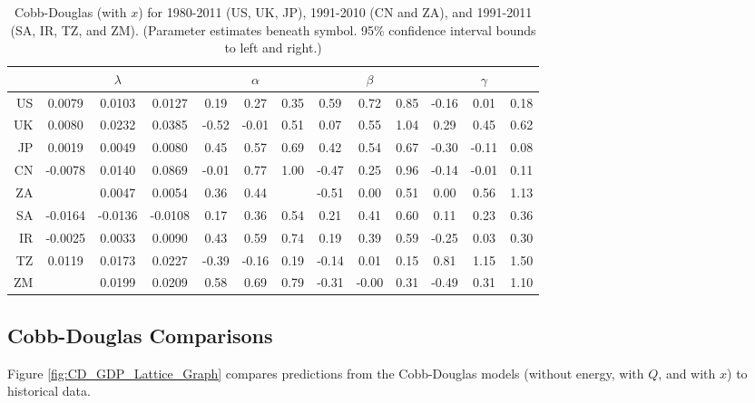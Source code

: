 \documentclass[preprint,authoryear,12pt]{elsarticle}\usepackage{graphicx, color}
\begin{document}
\begin{table}[ht]
\begin{center}
\caption{Cobb-Douglas (with $x$) for 1980-2011 (US, UK, JP), 1991-2010 (CN and ZA), and 1991-2011 (SA, IR, TZ, and ZM). (Parameter estimates beneath symbol. 95\% confidence interval bounds to left and right.)}
\label{tab:CD_Parameters_With_X}
{\tiny
\begin{tabular}{r|ccc|ccc|ccc|ccc}
  \hline
 &   & $\lambda$ &   &   & $\alpha$ &   &   & $\beta$ &   &   & $\gamma$ &   \\ 
  \hline
US & 0.0079 & 0.0103 & 0.0127 & 0.19 & 0.27 & 0.35 & 0.59 & 0.72 & 0.85 & -0.16 & 0.01 & 0.18 \\ 
  UK & 0.0080 & 0.0232 & 0.0385 & -0.52 & -0.01 & 0.51 & 0.07 & 0.55 & 1.04 & 0.29 & 0.45 & 0.62 \\ 
  JP & 0.0019 & 0.0049 & 0.0080 & 0.45 & 0.57 & 0.69 & 0.42 & 0.54 & 0.67 & -0.30 & -0.11 & 0.08 \\ 
  CN & -0.0078 & 0.0140 & 0.0869 & -0.01 & 0.77 & 1.00 & -0.47 & 0.25 & 0.96 & -0.14 & -0.01 & 0.11 \\ 
  ZA &  & 0.0047 & 0.0054 & 0.36 & 0.44 &  & -0.51 & 0.00 & 0.51 & 0.00 & 0.56 & 1.13 \\ 
  SA & -0.0164 & -0.0136 & -0.0108 & 0.17 & 0.36 & 0.54 & 0.21 & 0.41 & 0.60 & 0.11 & 0.23 & 0.36 \\ 
  IR & -0.0025 & 0.0033 & 0.0090 & 0.43 & 0.59 & 0.74 & 0.19 & 0.39 & 0.59 & -0.25 & 0.03 & 0.30 \\ 
  TZ & 0.0119 & 0.0173 & 0.0227 & -0.39 & -0.16 & 0.19 & -0.14 & 0.01 & 0.15 & 0.81 & 1.15 & 1.50 \\ 
  ZM &  & 0.0199 & 0.0209 & 0.58 & 0.69 & 0.79 & -0.31 & -0.00 & 0.31 & -0.49 & 0.31 & 1.10 \\ 
   \hline
\end{tabular}
}
\end{center}
\end{table}



\subsection{Cobb-Douglas Comparisons}

Figure \ref{fig:CD_GDP_Lattice_Graph} compares predictions from the Cobb-Douglas models (without energy, with $Q$, and with $x$) to historical data.
\end{document}
